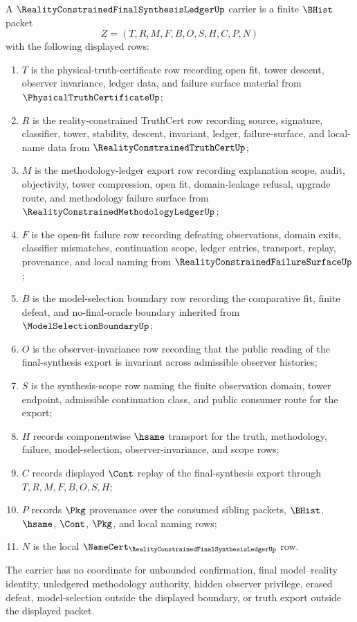 \begin{definition}
\label{def:reality-constrained-final-synthesis-ledger-carrier}
A $\RealityConstrainedFinalSynthesisLedgerUp$ carrier is a finite $\BHist$ packet
$$
Z=(T,R,M,F,B,O,S,H,C,P,N)
$$
with the following displayed rows:
\begin{enumerate}
\item $T$ is the physical-truth-certificate row recording open fit, tower descent, observer invariance, ledger data, and failure surface material from $\PhysicalTruthCertificateUp$;
\item $R$ is the reality-constrained TruthCert row recording source, signature, classifier, tower, stability, descent, invariant, ledger, failure-surface, and local-name data from $\RealityConstrainedTruthCertUp$;
\item $M$ is the methodology-ledger export row recording explanation scope, audit, objectivity, tower compression, open fit, domain-leakage refusal, upgrade route, and methodology failure surface from $\RealityConstrainedMethodologyLedgerUp$;
\item $F$ is the open-fit failure row recording defeating observations, domain exits, classifier mismatches, continuation scope, ledger entries, transport, replay, provenance, and local naming from $\RealityConstrainedFailureSurfaceUp$;
\item $B$ is the model-selection boundary row recording the comparative fit, finite defeat, and no-final-oracle boundary inherited from $\ModelSelectionBoundaryUp$;
\item $O$ is the observer-invariance row recording that the public reading of the final-synthesis export is invariant across admissible observer histories;
\item $S$ is the synthesis-scope row naming the finite observation domain, tower endpoint, admissible continuation class, and public consumer route for the export;
\item $H$ records componentwise $\hsame$ transport for the truth, methodology, failure, model-selection, observer-invariance, and scope rows;
\item $C$ records displayed $\Cont$ replay of the final-synthesis export through $T,R,M,F,B,O,S,H$;
\item $P$ records $\Pkg$ provenance over the consumed sibling packets, $\BHist$, $\hsame$, $\Cont$, $\Pkg$, and local naming rows;
\item $N$ is the local $\NameCert_{\RealityConstrainedFinalSynthesisLedgerUp}$ row.
\end{enumerate}
The carrier has no coordinate for unbounded confirmation, final model--reality identity, unledgered methodology authority, hidden observer privilege, erased defeat, model-selection outside the displayed boundary, or truth export outside the displayed packet.
\end{definition}

